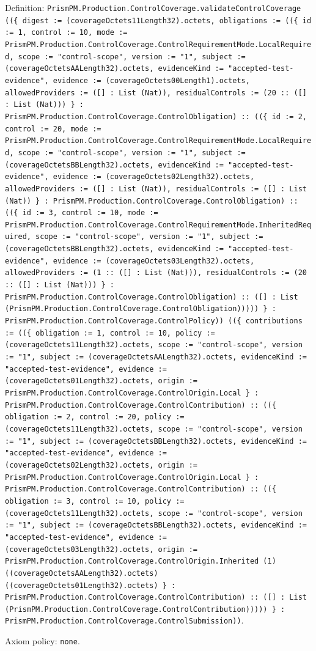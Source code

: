 \documentclass[11pt]{article}
\begin{document}
\noindent Definition: \texttt{PrismPM.Production.ControlCoverage.validateControlCoverage ((\{ digest := (coverageOctets11Length32).octets, obligations := ((\{ id := 1, control := 10, mode := PrismPM.Production.ControlCoverage.ControlRequirementMode.LocalRequired, scope := "control-scope", version := "1", subject := (coverageOctetsAALength32).octets, evidenceKind := "accepted-test-evidence", evidence := (coverageOctets00Length1).octets, allowedProviders := ([] : List (Nat)), residualControls := (20 :: ([] : List (Nat))) \} : PrismPM.Production.ControlCoverage.ControlObligation) :: ((\{ id := 2, control := 20, mode := PrismPM.Production.ControlCoverage.ControlRequirementMode.LocalRequired, scope := "control-scope", version := "1", subject := (coverageOctetsBBLength32).octets, evidenceKind := "accepted-test-evidence", evidence := (coverageOctets02Length32).octets, allowedProviders := ([] : List (Nat)), residualControls := ([] : List (Nat)) \} : PrismPM.Production.ControlCoverage.ControlObligation) :: ((\{ id := 3, control := 10, mode := PrismPM.Production.ControlCoverage.ControlRequirementMode.InheritedRequired, scope := "control-scope", version := "1", subject := (coverageOctetsBBLength32).octets, evidenceKind := "accepted-test-evidence", evidence := (coverageOctets03Length32).octets, allowedProviders := (1 :: ([] : List (Nat))), residualControls := (20 :: ([] : List (Nat))) \} : PrismPM.Production.ControlCoverage.ControlObligation) :: ([] : List (PrismPM.Production.ControlCoverage.ControlObligation))))) \} : PrismPM.Production.ControlCoverage.ControlPolicy)) ((\{ contributions := ((\{ obligation := 1, control := 10, policy := (coverageOctets11Length32).octets, scope := "control-scope", version := "1", subject := (coverageOctetsAALength32).octets, evidenceKind := "accepted-test-evidence", evidence := (coverageOctets01Length32).octets, origin := PrismPM.Production.ControlCoverage.ControlOrigin.Local \} : PrismPM.Production.ControlCoverage.ControlContribution) :: ((\{ obligation := 2, control := 20, policy := (coverageOctets11Length32).octets, scope := "control-scope", version := "1", subject := (coverageOctetsBBLength32).octets, evidenceKind := "accepted-test-evidence", evidence := (coverageOctets02Length32).octets, origin := PrismPM.Production.ControlCoverage.ControlOrigin.Local \} : PrismPM.Production.ControlCoverage.ControlContribution) :: ((\{ obligation := 3, control := 10, policy := (coverageOctets11Length32).octets, scope := "control-scope", version := "1", subject := (coverageOctetsBBLength32).octets, evidenceKind := "accepted-test-evidence", evidence := (coverageOctets03Length32).octets, origin := PrismPM.Production.ControlCoverage.ControlOrigin.Inherited (1) ((coverageOctetsAALength32).octets) ((coverageOctets01Length32).octets) \} : PrismPM.Production.ControlCoverage.ControlContribution) :: ([] : List (PrismPM.Production.ControlCoverage.ControlContribution))))) \} : PrismPM.Production.ControlCoverage.ControlSubmission))}.\par
\noindent Axiom policy: \texttt{none}.\par
\end{document}

